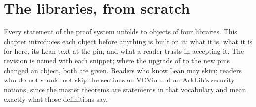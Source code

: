 \chapter{The libraries, from scratch}\label{ch:libraries}

Every statement of the proof system unfolds to objects of four libraries. This chapter
introduces each object before anything is built on it: what it is, what it is for here, its
Lean text at the pin, and what a reader trusts in accepting it. The revision is named with each
snippet; where the upgrade of  to the new pins changed an object, both are given.
Readers who know Lean may skim; readers who do not should not skip the sections on VCVio and on
ArkLib's security notions, since the master theorems are statements in that vocabulary and
mean exactly what those definitions say.






\label{sec:lib-security}

\label{sec:lib-pins}

\label{sec:lib-layer0}
